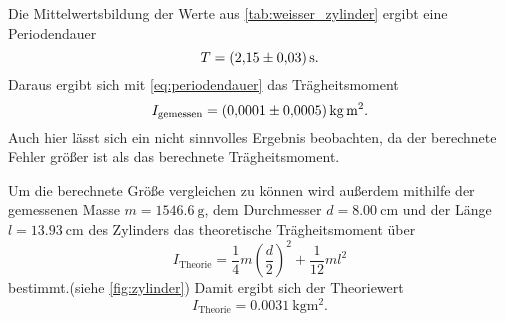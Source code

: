 Die Mittelwertsbildung der Werte aus \autoref{tab:weisser_zylinder} ergibt eine Periodendauer 
\begin{equation}
    T = \SI{2.15+-0.03}{\second}.
\end{equation}
Daraus ergibt sich mit \autoref{eq:periodendauer} das Trägheitsmoment
\begin{equation}
    I_\text{gemessen} = \SI{0.0001+-0.0005}{\kilo\gram\meter\squared}.
\end{equation}
Auch hier lässt sich ein nicht sinnvolles Ergebnis beobachten, da der berechnete Fehler größer ist als das berechnete Trägheitsmoment.

Um die berechnete Größe vergleichen zu können wird außerdem mithilfe der gemessenen Masse $m=\SI{1546.6}{\gram}$, dem Durchmesser $d=\SI{8.00}{\centi\meter}$ und der Länge $l=\SI{13.93}{\centi\meter}$ des Zylinders das theoretische Trägheitsmoment über
\begin{equation}
    I_\text{Theorie} = \frac{1}{4}m\left(\frac{d}{2}\right)^2 + \frac{1}{12}ml^2
\end{equation}
bestimmt.(siehe \autoref{fig:zylinder}) Damit ergibt sich der Theoriewert
\begin{equation}
    I_\text{Theorie} = \SI{0.0031}{\kilo\gram\meter\squared}.
\end{equation}